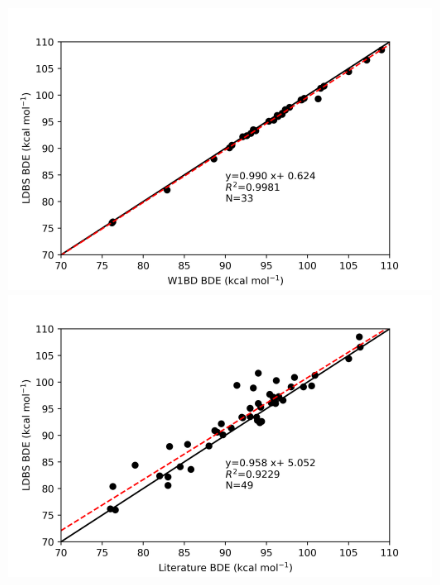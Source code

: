 \begin{figure}[H]
\hspace*{-1.8cm}
\begin{minipage}{8cm}
  \centering
  \includegraphics[width=\textwidth]{figures/w1bd-ldbs}
\end{minipage}%
\begin{minipage}{8cm}
  \centering
  \includegraphics[width=\textwidth]{figures/lit-ldbs}
\end{minipage}


\end{figure}
